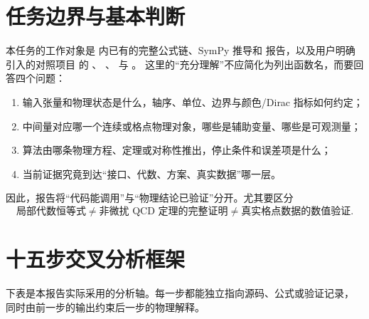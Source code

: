 \documentclass[UTF8,11pt,oneside]{ctexbook}
\begin{document}
\section{任务边界与基本判断}
本任务的工作对象是  内已有的完整公式链、SymPy 推导和
报告，以及用户明确引入的对照项目  的 、
、 与 。
这里的“充分理解”不应简化为列出函数名，而要回答四个问题：
\begin{enumerate}
  \item 输入张量和物理状态是什么，轴序、单位、边界与颜色/Dirac 指标如何约定；
  \item 中间量对应哪一个连续或格点物理对象，哪些是辅助变量、哪些是可观测量；
  \item 算法由哪条物理方程、定理或对称性推出，停止条件和误差项是什么；
  \item 当前证据究竟到达“接口、代数、方案、真实数据”哪一层。
\end{enumerate}
因此，报告将“代码能调用”与“物理结论已验证”分开。尤其要区分
\[
\text{局部代数恒等式}\ne\text{非微扰 QCD 定理的完整证明}
\ne\text{真实格点数据的数值验证}.
\]

\section{十五步交叉分析框架}
下表是本报告实际采用的分析轴。每一步都能独立指向源码、公式或验证记录，
同时由前一步的输出约束后一步的物理解释。
\end{document}
